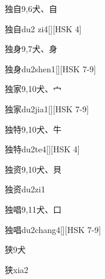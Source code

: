 \begin{Entry}{独自}{9,6}{⽝、⾃}
  \begin{Phonetics}{独自}{du2 zi4}[][HSK 4]
  \end{Phonetics}
\end{Entry}

\begin{Entry}{独身}{9,7}{⽝、⾝}
  \begin{Phonetics}{独身}{du2shen1}[][HSK 7-9]
  \end{Phonetics}
\end{Entry}

\begin{Entry}{独家}{9,10}{⽝、⼧}
  \begin{Phonetics}{独家}{du2jia1}[][HSK 7-9]
  \end{Phonetics}
\end{Entry}

\begin{Entry}{独特}{9,10}{⽝、⽜}
  \begin{Phonetics}{独特}{du2te4}[][HSK 4]
  \end{Phonetics}
\end{Entry}

\begin{Entry}{独资}{9,10}{⽝、⾙}
  \begin{Phonetics}{独资}{du2zi1}
  \end{Phonetics}
\end{Entry}

\begin{Entry}{独唱}{9,11}{⽝、⼝}
  \begin{Phonetics}{独唱}{du2chang4}[][HSK 7-9]
  \end{Phonetics}
\end{Entry}

\begin{Entry}{狭}{9}{⽝}
  \begin{Phonetics}{狭}{xia2}
  \end{Phonetics}
\end{Entry}

